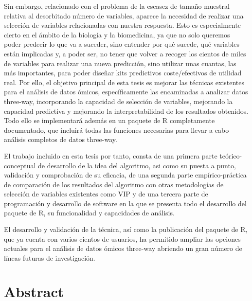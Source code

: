 Sin embargo, relacionado con el problema de la escasez de tamaño muestral relativa al desorbitado número de variables, aparece la necesidad de realizar una selección de variables relacionadas con nuestra respuesta. Esto es especialmente cierto en el ámbito de la biología y la biomedicina, ya que no solo queremos poder predecir lo que va a suceder, sino entender por qué sucede, qué variables están implicadas y, a poder ser, no tener que volver a recoger los cientos de miles de variables para realizar una nueva predicción, sino utilizar unas cuantas, las más importantes, para poder diseñar kits predictivos coste/efectivos de utilidad real. Por ello, el objetivo principal de esta tesis es mejorar las técnicas existentes para el análisis de datos ómicos, específicamente las encaminadas a analizar datos three-way, incorporando la capacidad de selección de variables, mejorando la capacidad predictiva y mejorando la interpretabilidad de los resultados obtenidos. Todo ello se implementará además en un paquete de R completamente documentado, que incluirá todas las funciones necesarias para llevar a cabo análisis completos de datos three-way. 

El trabajo incluido en esta tesis por tanto, consta de una primera parte teórico-conceptual de desarrollo de la idea del algoritmo, asi como su puesta a punto, validación y comprobación de su eficacia, de una segunda parte empírico-práctica de comparación de los resultados del algoritmo con otras metodologías de selección de variables existentes como VIP y de una tercera parte de programación y desarrollo de software en la que se presenta todo el desarrollo del paquete de R, su funcionalidad y capacidades de análisis. 

El desarrollo y validación de la técnica, así como la publicación del paquete de R, que ya cuenta con varios cientos de usuarios, ha permitido ampliar las opciones actuales para el análisis de datos ómicos three-way  abriendo un gran número de líneas futuras de investigación.


\ifEBOOKPDF
	\bigskip
\else
	\vfill
\fi


\chapter*{Abstract}


